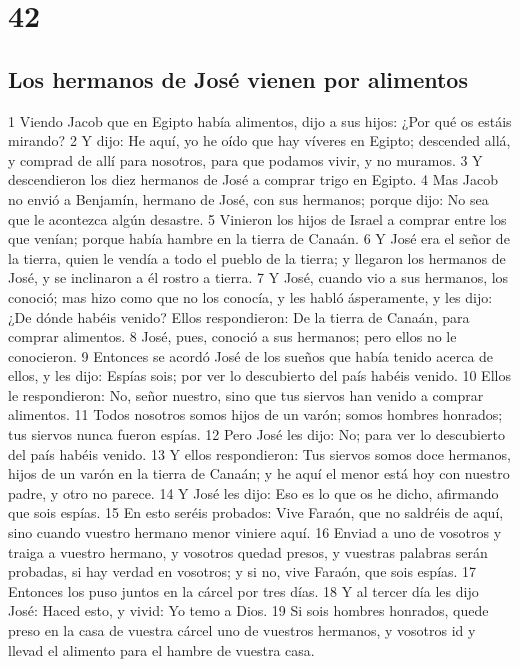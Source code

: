 \chapter{42}

\section{Los hermanos de José vienen por alimentos}

1 Viendo Jacob que en Egipto había alimentos, dijo a sus hijos: ¿Por qué os estáis mirando?
2 Y dijo: He aquí, yo he oído que hay víveres en Egipto; descended allá, y comprad de allí para nosotros, para que podamos vivir, y no muramos.
3 Y descendieron los diez hermanos de José a comprar trigo en Egipto.
4 Mas Jacob no envió a Benjamín, hermano de José, con sus hermanos; porque dijo: No sea que le acontezca algún desastre.
5 Vinieron los hijos de Israel a comprar entre los que venían; porque había hambre en la tierra de Canaán.
6 Y José era el señor de la tierra, quien le vendía a todo el pueblo de la tierra; y llegaron los hermanos de José, y se inclinaron a él rostro a tierra.
7 Y José, cuando vio a sus hermanos, los conoció; mas hizo como que no los conocía, y les habló ásperamente, y les dijo: ¿De dónde habéis venido? Ellos respondieron: De la tierra de Canaán, para comprar alimentos.
8 José, pues, conoció a sus hermanos; pero ellos no le conocieron.
9 Entonces se acordó José de los sueños que había tenido acerca de ellos, y les dijo: Espías sois; por ver lo descubierto del país habéis venido.
10 Ellos le respondieron: No, señor nuestro, sino que tus siervos han venido a comprar alimentos.
11 Todos nosotros somos hijos de un varón; somos hombres honrados; tus siervos nunca fueron espías.
12 Pero José les dijo: No; para ver lo descubierto del país habéis venido.
13 Y ellos respondieron: Tus siervos somos doce hermanos, hijos de un varón en la tierra de Canaán; y he aquí el menor está hoy con nuestro padre, y otro no parece.
14 Y José les dijo: Eso es lo que os he dicho, afirmando que sois espías.
15 En esto seréis probados: Vive Faraón, que no saldréis de aquí, sino cuando vuestro hermano menor viniere aquí.
16 Enviad a uno de vosotros y traiga a vuestro hermano, y vosotros quedad presos, y vuestras palabras serán probadas, si hay verdad en vosotros; y si no, vive Faraón, que sois espías.
17 Entonces los puso juntos en la cárcel por tres días.
18 Y al tercer día les dijo José: Haced esto, y vivid: Yo temo a Dios.
19 Si sois hombres honrados, quede preso en la casa de vuestra cárcel uno de vuestros hermanos, y vosotros id y llevad el alimento para el hambre de vuestra casa.
